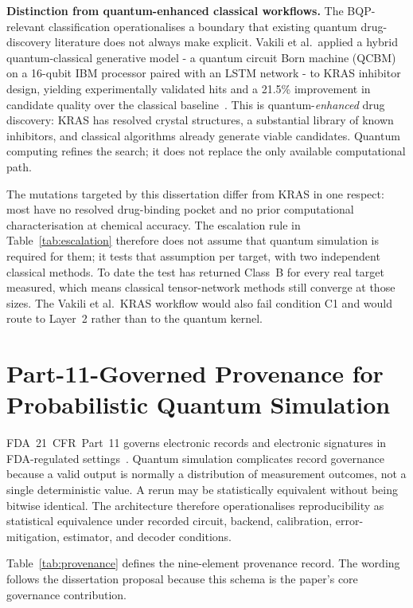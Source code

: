 \documentclass[11pt,letterpaper]{article}
\begin{document}
\textbf{Distinction from quantum-enhanced classical workflows.}  The BQP-relevant
classification operationalises a boundary that existing quantum drug-discovery literature
does not always make explicit.  Vakili et al.\ applied a hybrid quantum-classical
generative model - a quantum circuit Born machine (QCBM) on a 16-qubit IBM processor
paired with an LSTM network - to KRAS inhibitor design, yielding experimentally validated
hits and a 21.5\% improvement in candidate quality over the classical
baseline~\cite{vakili2025kras}.  This is quantum-\emph{enhanced} drug discovery: KRAS
has resolved crystal structures, a substantial library of known inhibitors, and classical
algorithms already generate viable candidates.  Quantum computing refines the search;
it does not replace the only available computational path.

The mutations targeted by this dissertation differ from KRAS in one respect: most have no
resolved drug-binding pocket and no prior computational characterisation at chemical accuracy.
The escalation rule in Table~\ref{tab:escalation} therefore does not assume that quantum
simulation is required for them; it tests that assumption per target, with two independent
classical methods.  To date the test has returned Class~B for every real target measured,
which means classical tensor-network methods still converge at those sizes.  The Vakili et
al.\ KRAS workflow would also fail condition C1 and would route to Layer~2 rather than to the
quantum kernel.

\section{Part-11-Governed Provenance for Probabilistic Quantum Simulation}

FDA~21~CFR~Part~11 governs electronic records and electronic signatures in FDA-regulated
settings~\cite{fda21cfr11,fda2003guidance}.  Quantum simulation complicates record governance
because a valid output is normally a distribution of measurement outcomes, not a single
deterministic value.  A rerun may be statistically equivalent without being bitwise identical.
The architecture therefore operationalises reproducibility as statistical equivalence under
recorded circuit, backend, calibration, error-mitigation, estimator, and decoder conditions.

Table~\ref{tab:provenance} defines the nine-element provenance record.  The wording follows
the dissertation proposal because this schema is the paper's core governance contribution.
\end{document}
